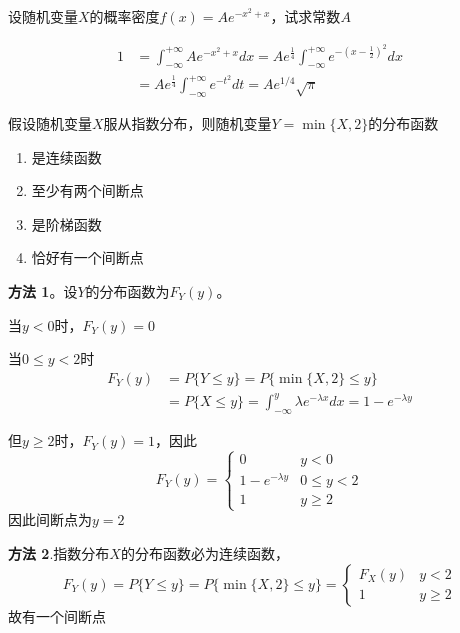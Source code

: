 \documentclass{article}
\begin{document}
\begin{examplle}[]
设随机变量\(X\)的概率密度\(f(x)=Ae^{-x^2+x}\)，试求常数\(A\)

\begin{align*}
1&=\int_{-\infty}^{+\infty}Ae^{-x^2+x}dx=Ae^{\frac{1}{4}}\int_{-\infty}^{+\infty}
e^{-(x-\frac{1}{2})^2}dx\\
&=Ae^{\frac{1}{4}}\int_{-\infty}^{+\infty}e^{-t^2}dt=Ae^{1/4}\sqrt{\pi}
\end{align*}
\end{examplle}

\begin{examplle}[]
假设随机变量\(X\)服从指数分布，则随机变量\(Y=\min\{X,2\}\)的分布函数
\begin{enumerate}
\item 是连续函数
\item 至少有两个间断点
\item 是阶梯函数
\item 恰好有一个间断点
\end{enumerate}


\textbf{方法 1}。设\(Y\)的分布函数为\(F_Y(y)\)。

当\(y<0\)时，\(F_Y(y)=0\)

当\(0\le y<2\)时
\begin{align*}
F_Y(y)&=P\{Y\le y\}=P\{\min\{X,2\}\le y\}\\
&=P\{X\le y\}=\int_{-\infty}^y\lambda e^{-\lambda x}dx=1-e^{-\lambda y}
\end{align*}

但\(y\ge2\)时，\(F_Y(y)=1\)，因此
\begin{equation*}
F_Y(y)=
\begin{cases}
0&y<0\\
1-e^{-\lambda y}&0\le y<2\\
1&y\ge2
\end{cases}
\end{equation*}
因此间断点为\(y=2\)

\textbf{方法 2}.指数分布\(X\)的分布函数必为连续函数，
\begin{equation*}
F_Y(y)=P\{Y\le y\}=P\{\min\{X,2\}\le y\}=
\begin{cases}
F_X(y)&y<2\\
1&y\ge2
\end{cases}
\end{equation*}
故有一个间断点
\end{examplle}
\end{document}
